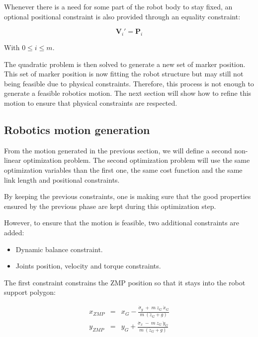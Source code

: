 \documentclass[letterpaper, 10 pt, conference]{ieeeconf}  %
\begin{document}
Whenever there is a need for some part of the robot body to stay
fixed, an optional positional constraint is also provided through an
equality constraint:

\begin{equation}
  \mathbf{V}_i' = \mathbf{P}_i
\end{equation}

With $0 \leq i \leq m$.



The quadratic problem is then solved to generate a new set of marker
position. This set of marker position is now fitting the robot
structure but may still not being feasible due to physical
constraints. Therefore, this process is not enough to generate a
feasible robotics motion. The next section will show how to refine
this motion to ensure that physical constraints are respected.


\subsection{Robotics motion generation}


From the motion generated in the previous section, we will define a
second non-linear optimization problem. The second optimization
problem will use the same optimization variables than the first one,
the same cost function and the same link length and positional
constraints.


By keeping the previous constraints, one is making sure that the good
properties ensured by the previous phase are kept during this
optimization step.


However, to ensure that the motion is feasible, two additional
constraints are added:
\begin{itemize}
\item Dynamic balance constraint.
\item Joints position, velocity and torque constraints.
\end{itemize}


The first constraint constrains the ZMP position so that it stays into
the robot support polygon:

\begin{equation}
  \begin{array}{ccc}
    x_{ZMP} &=& x_G - \frac{\dot{\sigma}_y\ +\ m\ z_G\ \ddot{x}_G}{m\ (\ddot{z}_G + g)} \\
    y_{ZMP} &=& y_G + \frac{\dot{\sigma}_x\ -\ m\ z_G\ \ddot{y}_G}{m\ (\ddot{z}_G + g)}
    \end{array}
\end{equation}
\end{document}
